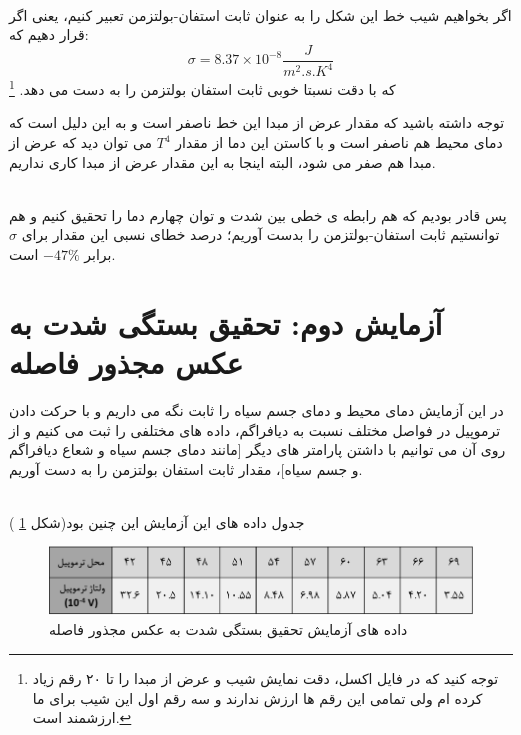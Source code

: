 \documentclass{article}
\begin{document}
   
   \noindent \\
   اگر بخواهیم شیب خط این شکل را به عنوان ثابت استفان-بولتزمن تعبیر کنیم، یعنی اگر قرار دهیم که:
   \[
   \sigma = 8.37 \times 10^{-8} \frac{J}{m^2 .s .  K^4}
   \]
  که با دقت نسبتا خوبی ثابت استفان بولتزمن را به دست می دهد.
  \footnote{
توجه کنید که در فایل اکسل، دقت نمایش شیب و عرض از مبدا را تا ۲۰ رقم زیاد کرده ام ولی تمامی این رقم ها ارزش ندارند و سه رقم اول این شیب برای ما ارزشمند است.  
}
  
  \noindent
  توجه داشته باشید که مقدار عرض از مبدا این خط ناصفر است و به این دلیل است که دمای محیط هم ناصفر است و با کاستن این دما از مقدار 
  $T^4$
  می توان دید که عرض از مبدا هم صفر می شود، البته اینجا به این مقدار عرض از مبدا کاری نداریم.
  
  \noindent\\
  پس قادر بودیم که هم رابطه ی خطی بین شدت و توان چهارم دما را تحقیق کنیم و هم توانستیم ثابت استفان-بولتزمن را بدست آوریم؛ درصد خطای نسبی این مقدار برای 
  $\sigma$
   برابر 
   $-47\%$
   است.

\section{آزمایش دوم: تحقیق بستگی شدت به عکس مجذور فاصله }
در این آزمایش دمای محیط و دمای جسم سیاه را ثابت نگه می داریم و با حرکت دادن ترموپیل در فواصل مختلف نسبت به دیافراگم، داده های مختلفی را ثبت می کنیم و از روی آن می توانیم با داشتن پارامتر های دیگر [مانند دمای جسم سیاه و شعاع دیافراگم و جسم سیاه]، مقدار ثابت استفان بولتزمن را به دست آوریم.

\noindent\\
جدول داده های این آزمایش این چنین بود(شکل 
\ref{Fig3}
)
\begin{figure}[h]
	\centering
	\includegraphics[scale=0.6]{3.png}
	\caption{ داده های آزمایش تحقیق بستگی شدت به عکس مجذور فاصله}
	\label{Fig3}
\end{figure}
\end{document}
